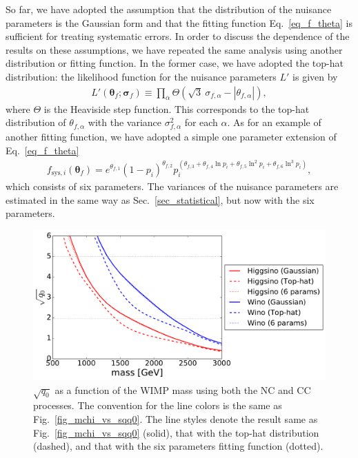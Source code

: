 \documentclass[12pt,twoside,book]{article}
\begin{document}
So far, we have adopted the assumption that the distribution of the nuisance parameters is the Gaussian form and that the fitting function Eq.~\eqref{eq_f_theta} is sufficient for treating systematic errors.
In order to discuss the dependence of the results on these assumptions, we have repeated the same analysis using another distribution or fitting function.
In the former case, we have adopted the top-hat distribution: the likelihood function for the nuisance parameters $L'$ is given by
\begin{align}
  L' (\bm{\theta}_f ; \bm{\sigma}_f) \equiv \prod_\alpha
  \Theta \left( \sqrt{3}\ \sigma_{f,\alpha}
  - \left| \theta_{f,\alpha} \right| \right),
\end{align}
where $\Theta$ is the Heaviside step function.
This corresponds to the top-hat distribution of $\theta_{f,\alpha}$ with the variance $\sigma_{f,\alpha}^2$ for each $\alpha$.
As for an example of another fitting function, we have adopted a simple one parameter extension of Eq.~\eqref{eq_f_theta}
\begin{align}
 f_{\mathrm{sys}, i} (\bm{\theta}_f) =
 e^{\theta_{f,1}} (1 - p_i)^{\theta_{f,2}}
 p_i^{(\theta_{f,3} + \theta_{f,4} \ln p_i + \theta_{f,5} \ln^2 p_i
 + \theta_{f,6} \ln^3 p_i)},\label{eq_6_param}
\end{align}
which consists of six parameters.
The variances of the nuisance parameters are estimated in the same way as Sec.~\ref{sec_statistical}, but now with the six parameters.

\begin{figure}[t]
  \centering
  \includegraphics[width=0.7\linewidth]{mchi_vs_sqq0_comp.pdf}
  \caption{
    $\sqrt{q_0}$ as a function of the WIMP mass using both the NC and CC processes.
    The convention for the line colors is the same as Fig.~\ref{fig_mchi_vs_sqq0}.  The line styles denote the result same as Fig.~\ref{fig_mchi_vs_sqq0} (solid), that with the top-hat distribution (dashed), and that with the six parameters fitting function (dotted).
  }
  \label{fig_mchi_vs_sqq0_comp}
\end{figure}
\end{document}
